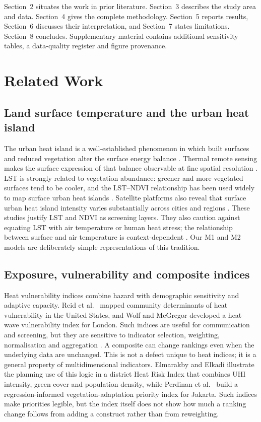 \documentclass[times,twoside]{_Templates/MultiTargetManuscript}
\begin{document}
Section~2 situates the work in prior literature. Section~3 describes the study
area and data. Section~4 gives the complete methodology. Section~5 reports
results, Section~6 discusses their interpretation, and Section~7 states
limitations. Section~8 concludes. Supplementary material contains additional
sensitivity tables, a data-quality register and figure provenance.

\section{Related Work}

\subsection{Land surface temperature and the urban heat island}

The urban heat island is a well-established phenomenon in which built surfaces
and reduced vegetation alter the surface energy balance \citep{oke1982}. Thermal
remote sensing makes the surface expression of that balance observable at fine
spatial resolution \citep{voogt2003}. LST is strongly related to vegetation
abundance: greener and more vegetated surfaces tend to be cooler, and the
LST--NDVI relationship has been used widely to map surface urban heat islands
\citep{weng2004,peng2012,estoque2017}. Satellite platforms also reveal that
surface urban heat island intensity varies substantially across cities and
regions \citep{peng2012,zhou2019}. These studies justify LST and NDVI as
screening layers. They also caution against equating LST with air temperature or
human heat stress; the relationship between surface and air temperature is
context-dependent \citep{schwarz2012}. Our M1 and M2 models are deliberately
simple representations of this tradition.

\subsection{Exposure, vulnerability and composite indices}

Heat vulnerability indices combine hazard with demographic sensitivity and
adaptive capacity. Reid et al.\ \citep{reid2009} mapped community determinants of
heat vulnerability in the United States, and Wolf and McGregor
\citep{wolf2013} developed a heat-wave vulnerability index for London. Such
indices are useful for communication and screening, but they are sensitive to
indicator selection, weighting, normalisation and aggregation
\citep{saisana2005,paruolo2013,greco2019}. A composite can change rankings even
when the underlying data are unchanged. This is not a defect unique to heat
indices; it is a general property of multidimensional indicators. Elmarakby and
Elkadi \citep{elmarakby2024} illustrate the planning use of this logic in a
district Heat Risk Index that combines UHI intensity, green cover and population
density, while Perdinan et al.\ \citep{perdinan2026} build a regression-informed
vegetation-adaptation priority index for Jakarta. Such indices make priorities
legible, but the index itself does not show how much a ranking change follows
from adding a construct rather than from reweighting.
\end{document}
